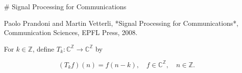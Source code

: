 # Signal Processing for Communications

Paolo Prandoni and Martin Vetterli, *Signal Processing for Communications*, Communication Sciences, EPFL Press, 2008.

For $k \in \mathbb{Z}$, define $T_k:\mathbb{C}^\mathbb{Z} \to \mathbb{C}^\mathbb{Z}$ by

$$
(T_k f)(n) = f(n-k), \quad f \in \mathbb{C}^\mathbb{Z}, \quad n \in \mathbb{Z}.
$$
